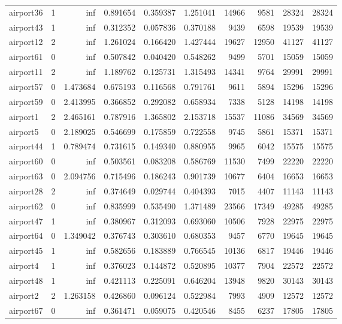 \begin{longtable}{|l|r|r|r|r|r|r|r|r|r|}
airport36 & 1 & inf & 0.891654 & 0.359387 & 1.251041 & 14966 & 9581 & 28324 & 28324 \\
airport43 & 1 & inf & 0.312352 & 0.057836 & 0.370188 & 9439 & 6598 & 19539 & 19539 \\
airport12 & 2 & inf & 1.261024 & 0.166420 & 1.427444 & 19627 & 12950 & 41127 & 41127 \\
airport61 & 0 & inf & 0.507842 & 0.040420 & 0.548262 & 9499 & 5701 & 15059 & 15059 \\
airport11 & 2 & inf & 1.189762 & 0.125731 & 1.315493 & 14341 & 9764 & 29991 & 29991 \\
airport57 & 0 & 1.473684 & 0.675193 & 0.116568 & 0.791761 & 9611 & 5894 & 15296 & 15296 \\
airport59 & 0 & 2.413995 & 0.366852 & 0.292082 & 0.658934 & 7338 & 5128 & 14198 & 14198 \\
airport1 & 2 & 2.465161 & 0.787916 & 1.365802 & 2.153718 & 15537 & 11086 & 34569 & 34569 \\
airport5 & 0 & 2.189025 & 0.546699 & 0.175859 & 0.722558 & 9745 & 5861 & 15371 & 15371 \\
airport44 & 1 & 0.789474 & 0.731615 & 0.149340 & 0.880955 & 9965 & 6042 & 15575 & 15575 \\
airport60 & 0 & inf & 0.503561 & 0.083208 & 0.586769 & 11530 & 7499 & 22220 & 22220 \\
airport63 & 0 & 2.094756 & 0.715496 & 0.186243 & 0.901739 & 10677 & 6404 & 16653 & 16653 \\
airport28 & 2 & inf & 0.374649 & 0.029744 & 0.404393 & 7015 & 4407 & 11143 & 11143 \\
airport62 & 0 & inf & 0.835999 & 0.535490 & 1.371489 & 23566 & 17349 & 49285 & 49285 \\
airport47 & 1 & inf & 0.380967 & 0.312093 & 0.693060 & 10506 & 7928 & 22975 & 22975 \\
airport64 & 0 & 1.349042 & 0.376743 & 0.303610 & 0.680353 & 9457 & 6770 & 19645 & 19645 \\
airport45 & 1 & inf & 0.582656 & 0.183889 & 0.766545 & 10136 & 6817 & 19446 & 19446 \\
airport4 & 1 & inf & 0.376023 & 0.144872 & 0.520895 & 10377 & 7904 & 22572 & 22572 \\
airport48 & 1 & inf & 0.421113 & 0.225091 & 0.646204 & 13948 & 9820 & 30143 & 30143 \\
airport2 & 2 & 1.263158 & 0.426860 & 0.096124 & 0.522984 & 7993 & 4909 & 12572 & 12572 \\
airport67 & 0 & inf & 0.361471 & 0.059075 & 0.420546 & 8455 & 6237 & 17805 & 17805 \\

\end{longtable}

